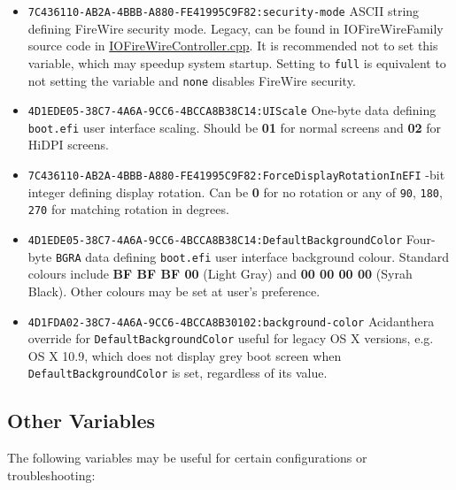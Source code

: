 \documentclass[]{article}
\begin{document}
\begin{itemize}
  will not enable ABC keyboard, unlike previous and subsequent macOS versions, and is thus not recommended in case 10.14 is needed.
\item
  \texttt{7C436110-AB2A-4BBB-A880-FE41995C9F82:security-mode}
  \break
  ASCII string defining FireWire security mode. Legacy, can be found in IOFireWireFamily
  source code in
  \href{https://github.com/apple-oss-distributions/IOFireWireFamily/blob/main/IOFireWireFamily.kmodproj/IOFireWireController.cpp}{IOFireWireController.cpp}.
  It is recommended not to set this variable, which may speedup system startup. Setting to
  \texttt{full} is equivalent to not setting the variable and \texttt{none} disables
  FireWire security.
\item
  \texttt{4D1EDE05-38C7-4A6A-9CC6-4BCCA8B38C14:UIScale}
  \break
  One-byte data defining \texttt{boot.efi} user interface scaling. Should be \textbf{01} for normal
  screens and \textbf{02} for HiDPI screens.
\item
  \texttt{7C436110-AB2A-4BBB-A880-FE41995C9F82:ForceDisplayRotationInEFI}
  -bit integer defining display rotation. Can be \textbf{0} for no rotation
  or any of \texttt{90}, \texttt{180}, \texttt{270} for matching rotation in degrees.
\item
  \texttt{4D1EDE05-38C7-4A6A-9CC6-4BCCA8B38C14:DefaultBackgroundColor}
  \break
  Four-byte \texttt{BGRA} data defining \texttt{boot.efi} user interface background colour.
  Standard colours include \textbf{BF BF BF 00} (Light Gray) and \textbf{00 00 00 00}
  (Syrah Black). Other colours may be set at user's preference.
\item
  \texttt{4D1FDA02-38C7-4A6A-9CC6-4BCCA8B30102:background-color}
  \break
  Acidanthera override for \texttt{DefaultBackgroundColor} useful for legacy OS X
  versions, e.g. OS X 10.9, which does not display grey boot screen when
  \texttt{DefaultBackgroundColor} is set, regardless of its value.
\end{itemize}

\subsection{Other Variables}\label{nvramvarsother}

The following variables may be useful for certain configurations or
troubleshooting:
\end{document}
